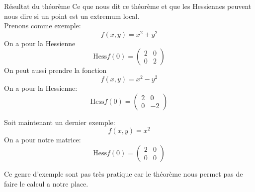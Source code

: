        \begin{parag}{Résultat du théorème}
           Ce que nous dit ce théorème et que les Hessiennes peuvent nous dire si un point est un extremum local.\\
           Prenons comme exemple:
           \begin{equation*} f\left(x, y\right) = x^2 + y^2 \end{equation*}
           On a pour la Hessienne
           \begin{equation*} \text{Hess} f\left(0\right) = \begin{pmatrix} 2 & 0 \\ 0 & 2 \end{pmatrix} \end{equation*}
           On peut aussi prendre la fonction
           \begin{equation*} f\left(x, y\right) = x^2 - y^2 \end{equation*}
           On a pour la Hessienne:
                    \begin{equation*} \text{Hess} f\left(0\right) = \begin{pmatrix} 2 & 0 \\ 0 & -2 \end{pmatrix} \end{equation*}
   

                    Soit maintenant un dernier exemple:
                    \begin{equation*} f\left(x, y\right) = x^2 \end{equation*}
                    On a pour notre matrice:
         \begin{equation*} \text{Hess} f\left(0\right) = \begin{pmatrix} 2 & 0 \\ 0 & 0 \end{pmatrix} \end{equation*}
   
         Ce genre d'exemple sont pas très pratique car le théorème nous permet pas de faire le calcul a notre place.
       \end{parag}
